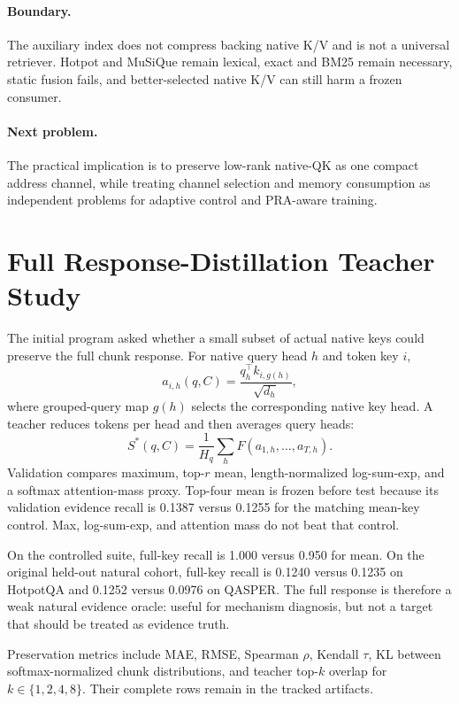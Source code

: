 \documentclass[11pt]{article}
\newcommand{\qk}{\textsc{QK}\xspace}
\newcommand{\kv}{\textsc{K/V}\xspace}
\newcommand{\hotpot}{HotpotQA\xspace}
\newcommand{\qasper}{QASPER\xspace}
\newcommand{\musique}{MuSiQue\xspace}
\begin{document}
\paragraph{Boundary.}
The auxiliary index does not compress backing native \kv and is not a universal
retriever. Hotpot and \musique remain lexical, exact and BM25 remain necessary,
static fusion fails, and better-selected native \kv can still harm a frozen
consumer.

\paragraph{Next problem.}
The practical implication is to preserve low-rank native-\qk as one compact
address channel, while treating channel selection and memory consumption as
independent problems for adaptive control and PRA-aware training.

\appendix
\section{Full Response-Distillation Teacher Study}
The initial program asked whether a small subset of actual native keys could
preserve the full chunk response. For native query head $h$ and token key $i$,
\begin{equation}
  a_{i,h}(q,C)=\frac{q_h^\top k_{i,g(h)}}{\sqrt{d_h}},
\end{equation}
where grouped-query map $g(h)$ selects the corresponding native key head. A
teacher reduces tokens per head and then averages query heads:
\begin{equation}
  S^*(q,C)=\frac{1}{H_q}\sum_h F(a_{1,h},\ldots,a_{T,h}).
\end{equation}
Validation compares maximum, top-$r$ mean, length-normalized log-sum-exp, and a
softmax attention-mass proxy. Top-four mean is frozen before test because its
validation evidence recall is 0.1387 versus 0.1255 for the matching mean-key
control. Max, log-sum-exp, and attention mass do not beat that control.

On the controlled suite, full-key recall is 1.000 versus 0.950 for mean. On the
original held-out natural cohort, full-key recall is 0.1240 versus 0.1235 on
\hotpot and 0.1252 versus 0.0976 on \qasper. The full response is therefore a
weak natural evidence oracle: useful for mechanism diagnosis, but not a target
that should be treated as evidence truth.

Preservation metrics include MAE, RMSE, Spearman $\rho$, Kendall $\tau$, KL
between softmax-normalized chunk distributions, and teacher top-$k$ overlap for
$k\in\{1,2,4,8\}$. Their complete rows remain in the tracked artifacts.
\end{document}
